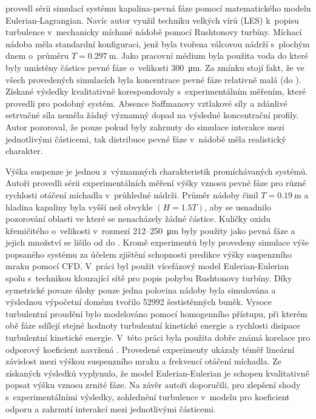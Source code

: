 \citet{derk03} provedl sérii simulací systému kapalina-pevná fáze pomocí matematického modelu Eulerian-Lagrangian. Navíc autor využil techniku velkých vírů (LES) k~popisu turbulence v~mechanicky míchané nádobě pomocí Rushtonovy turbíny. Míchací nádoba měla standardní konfiguraci, jenž byla tvořena válcovou nádrží s~plochým dnem o~průměru $T=\SI{0.297}{\meter}$. Jako pracovní médium byla použita voda do které byly umístěny částice pevné fáze o~velikosti \SI{300}{\micro\meter}. Za zmínku stojí fakt, že ve všech provedených simulacích byla koncentrace pevné fáze relativně malá (do ). Získané výsledky kvalitativně korespondovaly s~experimentálním měřením, které provedli \citet{miche03} pro podobný systém. Absence Saffmanovy vztlakové síly a zdánlivé setrvačné síla neměla žádný významný dopad na výsledné koncentrační profily. Autor pozoroval, že pouze pokud byly zahrnuty do simulace interakce mezi jednotlivými částicemi, tak distribuce pevné fáze v~nádobě měla realistický charakter. 

Výška suspenze je jednou z~významných charakteristik promíchávaných systémů. Autoři \citet{mic04} provedli sérii experimentálních měření výšky vznosu pevné fáze pro různé rychlosti otáčení míchadla v~průhledné nádrži. Průměr nádoby činil $T=\SI{0.19}{\meter}$ a hladina kapaliny byla vyšší než obvykle $(H=\num{1.5}T)$, aby se usnadnilo pozorování oblasti ve které se nenacházely žádné částice. Kuličky oxidu křemičitého o~velikosti v~rozmezí \num{212}--\SI{250}{\micro\meter} byly použity jako pevná fáze a jejich množství se lišilo od  do . Kromě experimentů byly provedeny simulace výše popsaného systému za účelem zjištění schopnosti predikce výšky suspenzního mraku pomocí CFD. V~práci byl použit vícefázový model Eulerian-Eulerian spolu s~technikou klouzající sítě pro popis pohybu Rushtonovy turbíny. Díky symetrické povaze úlohy pouze jedna polovina nádoby byla simulována a výslednou výpočetní doménu tvořilo \num{52992} šestistěnných buněk. Vysoce turbulentní proudění bylo modelováno pomocí homogenního \keps{} přístupu, při kterém obě fáze sdílejí stejné hodnoty turbulentní kinetické energie a rychlosti disipace turbulentní kinetické energie. V~této práci byla použita dobře známá korelace pro odporový koeficient navržená \citet{schi32}. Provedené experimenty ukázaly téměř lineární závislost mezi výškou suspenzního mraku a frekvencí otáčení míchadla. Ze získaných výsledků vyplynulo, že model Eulerian-Eulerian je schopen kvalitativně popsat výšku vznosu zrnité fáze. Na závěr autoři doporučili, pro zlepšení shody s~experimentálními výsledky, zohlednění turbulence v~modelu pro koeficient odporu a zahrnutí interakcí mezi jednotlivými částicemi.

